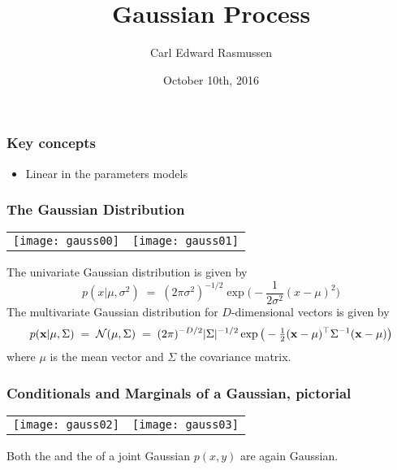 

\title{Gaussian Process}
\author{Carl Edward Rasmussen}
\date{October 10th, 2016}



\begin{frame}
\titlepage
\end{frame}

\begin{frame}
\frametitle{Key concepts}
\begin{itemize}
\item Linear in the parameters models
\end{itemize}
\end{frame}

\begin{frame}
\frametitle{The Gaussian Distribution}
\begin{center}
\begin{tabular}{cc}
\texttt{[image: gauss00]} &
{\texttt{[image: gauss01]}}
\end{tabular}
\end{center}
The univariate Gaussian distribution is given by
\[
p(x|\mu,\sigma^2) \;=\; (2 \pi \sigma^2 )^{-1/2} \exp \big( - \frac{1}{2
  \sigma^2} (x-\mu)^2 \big)
\]
The multivariate Gaussian distribution for $D$-dimensional vectors is given by
\[
p(\mathbf x|\mu,\Sigma)\;=\;{\cal N}(\mu,\Sigma)\;=\;(2\pi)^{-D/2}|\Sigma|^{-1/2}
\exp\big(-\tfrac{1}{2}(\mathbf x-\mu)^\top\Sigma^{-1}(\mathbf x-\mu)\big)
\]
where $\mu$ is the mean vector and $\Sigma$ the covariance matrix.
\end{frame}


\begin{frame}
\frametitle{Conditionals and Marginals of a Gaussian, pictorial}
\begin{center}
\begin{tabular}{cc}
\texttt{[image: gauss02]} &
{\texttt{[image: gauss03]}}
\end{tabular}
\end{center}

Both the  and the 
of a joint Gaussian $p(x,y)$ are again Gaussian.
\end{frame}


